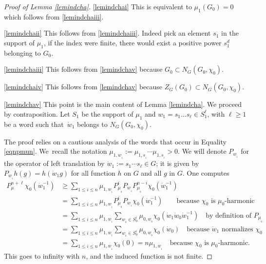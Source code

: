 \documentclass[11pt]{article}
\newcommand{\skpt}{\smallskip}
\numberwithin{equation}{section}
\theoremstyle{definition}
\begin{document}
\skpt
\begin{proof}[Proof of Lemma \ref{lemindcha}]
\eqref{lemindchai} This is equivalent to $\mu_1(G_0)=0$ which follows from \eqref{lemindchaiii}.

\eqref{lemindchaii} This follows from \eqref{lemindchaiii}. Indeed pick an element $s_1$
in the support of $\mu_1$, if the index were finite, there would exist a
positive power
$s_1^d$ belonging to $G_0$.

\eqref{lemindchaiii} This follows from \eqref{lemindchav} because $G_0\subset N_G(G_0,\chi_0)$.

\eqref{lemindchaiv} This follows from \eqref{lemindchav} because $Z_G(G_0)\subset N_G(G_0,\chi_0)$.

\eqref{lemindchav} This point is the main content of Lemma \ref{lemindcha}. We proceed by contraposition.
Let $S_1$ be the support of $\mu_1$ and
$w_1=s_1\ldots s_\ell\in S_1^\ell$, with $\ell\geq 1$ be a word
such that~$\dot{w}_{1}$ belongs to $N_G(G_0,\chi_0)$.

The proof relies on a cautious analysis of the words that occur in Equality \eqref{eqnpmun}.
We~recall the notation
$\mu_{1,w_{_1}}:=\mu_{1,s_{_1}}\!\cdots\mu_{1,s_{_\ell}}>0$.
We will denote $P_{w_{_1}}$ for the operator
of left translation by $\dot{w}_{1}:=s_1\cdots s_\ell\in G$; it is given by
$P_{w_{_1}}h(g)=h(\dot{w}_{1}g)$ for all function $h$ on $G$ and all $g$ in $G$.
One computes
\begin{align*}
P_\mu^{n+\ell}\chi_0(\dot{w}_{1}^{-1})
&\geq \sum_{1\leq i\leq n}
\mu_{1,w_{_1}} P^i_{\mu_{_0}}P_{w_{_1}}P^{n-i}_{\mu_{_0}}\chi_0(\dot{w}_{1}^{-1})\\
&= \sum_{1\leq i\leq n}
\mu_{1,w_{_1}} P^i_{\mu_{_0}}P_{w_{_1}}\chi_0(\dot{w}_{1}^{-1})
\hspace{2em}\text{because $\chi_0$ is $\mu_0$-harmonic}\\
&= \sum_{1\leq i\leq n} \mu_{1,w_{_1}}
\sum_{w_{_0}\in S_0^i}\mu_{0,w_{_0}}
\chi_0(\dot{w}_{1}\dot{w}_{0}\dot{w}_{1}^{-1})
\hspace{1em}\text{by definition of $P_{\mu_{_0}}$}\\
&= \sum_{1\leq i\leq n} \mu_{1,w_{_1}}
\sum_{w_{_0}\in S_0^i}\mu_{0,w_{_0}}
\chi_0(\dot{w}_{0})
\hspace{1em}\text{because $\dot{w}_{1}$ normalizes $\chi_0$}\\
&= \sum_{1\leq i\leq n} \mu_{1,w_{_1}}
\chi_0(0)= n\mu_{1,w_{_1}}
\hspace{1em}\text{because $\chi_0$ is $\mu_0$-harmonic.}
\end{align*}
This goes to infinity with $n$, and the induced function is not finite.
\end{proof}
\end{document}
